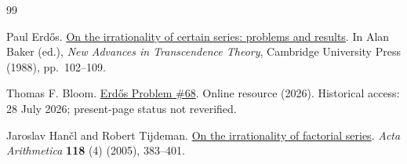 \documentclass[11pt]{article}
\begin{document}
\begin{thebibliography}{99}

Paul Erd{\H o}s. \href{https://doi.org/10.1017/CBO9780511897184.009}{On the irrationality of certain series: problems and results}.
In Alan Baker (ed.), \emph{New Advances in Transcendence Theory}, Cambridge University Press (1988), pp.~102--109.

Thomas F. Bloom. \href{https://www.erdosproblems.com/68}{Erd{\H o}s Problem {\#68}}.
Online resource (2026). Historical access: 28 July 2026; present-page status not reverified.

Jaroslav Han{\v c}l and Robert Tijdeman. \href{https://doi.org/10.4064/aa118-4-5}{On the irrationality of factorial series}.
\emph{Acta Arithmetica} \textbf{118} (4) (2005), 383--401.

\end{thebibliography}
\end{document}
